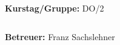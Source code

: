 \documentclass[12pt,a4paper]{article}
\begin{document}
\begin{verbatim}


\end{verbatim}
			\begin{flushleft}
			\textbf{\Large{Kurstag/Gruppe:}} \Large{DO/2}
			\end{flushleft}

\begin{verbatim}

\end{verbatim}
			\begin{flushleft}
			\LARGE{\textbf{Betreuer:}}	\Large{Franz Sachslehner}	
			\end{flushleft}

\pagebreak
\setlength{\columnsep}{20pt}
\end{document}
